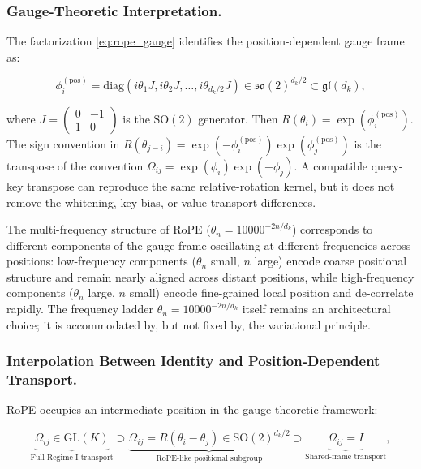 \documentclass[twoside,11pt]{article}
\begin{document}
\subsubsection{Gauge-Theoretic Interpretation.}

The factorization \eqref{eq:rope_gauge} identifies the position-dependent gauge frame as:

\begin{equation}
\phi_i^{(\mathrm{pos})} = \mathrm{diag}(i\theta_1 J, i\theta_2 J, \ldots, i\theta_{d_k/2} J) \in \mathfrak{so}(2)^{d_k/2} \subset \mathfrak{gl}(d_k),
\label{eq:rope_lie_algebra}
\end{equation}

where $J = \left(\begin{smallmatrix} 0 & -1 \\ 1 & 0 \end{smallmatrix}\right)$ is the $\mathrm{SO}(2)$ generator. Then $R(\theta_i)=\exp(\phi_i^{(\mathrm{pos})})$. The sign convention in $R(\theta_{j-i})=\exp(-\phi_i^{(\mathrm{pos})})\exp(\phi_j^{(\mathrm{pos})})$ is the transpose of the convention $\Omega_{ij}=\exp(\phi_i)\exp(-\phi_j)$. A compatible query-key transpose can reproduce the same relative-rotation kernel, but it does not remove the whitening, key-bias, or value-transport differences.

The multi-frequency structure of RoPE ($\theta_n = 10000^{-2n/d_k}$) corresponds to different components of the gauge frame oscillating at different frequencies across positions: low-frequency components ($\theta_n$ small, $n$ large) encode coarse positional structure and remain nearly aligned across distant positions, while high-frequency components ($\theta_n$ large, $n$ small) encode fine-grained local position and de-correlate rapidly. The frequency ladder $\theta_n = 10000^{-2n/d_k}$ itself remains an architectural choice; it is accommodated by, but not fixed by, the variational principle. 

\subsubsection{Interpolation Between Identity and Position-Dependent Transport.}

RoPE occupies an intermediate position in the gauge-theoretic framework:

\begin{equation}
\underbrace{\Omega_{ij}\in\mathrm{GL}(K)}_{\text{Full Regime-I transport}} \supset
\underbrace{\Omega_{ij}=R(\theta_i-\theta_j)\in\mathrm{SO}(2)^{d_k/2}}_{\text{RoPE-like positional subgroup}} \supset
\underbrace{\Omega_{ij}=I}_{\text{Shared-frame transport}},
\end{equation}
\end{document}
